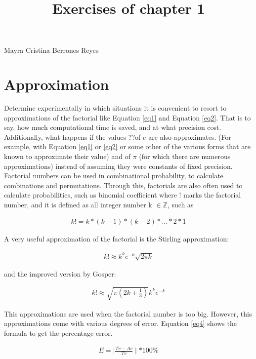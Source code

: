 \documentclass{article}
\begin{document}
\title{Exercises of chapter 1}


\maketitle
Mayra Cristina Berrones Reyes

\section{Approximation}

Determine experimentally in which situations it is convenient to resort to approximations of the factorial like Equation \ref{eq1} and Equation \ref{eq2}. That is to say, how much computational time is saved, and at what precision cost. Additionally, what happens if the values ??of $e$ are also approximates. (For example, with Equation \ref{eq1} or \ref{eq2} or some other of the various forms that are known to approximate their value) and of $\pi$ (for which there are numerous approximations) instead of assuming they were constants of fixed precision.\\

Factorial numbers can be used in combinational probability, to calculate combinations and permutations. Through this, factorials are also often used to calculate probabilities, such as binomial coefficient  where ! marks the factorial number, and it is defined as all integer number k $\in \mathbb{Z}$, such as

\begin{eqnarray}
\label{eq3}
k! = k * (k - 1) * (k - 2) *... * 2 *1
\end{eqnarray}

A very useful approximation  of the factorial is the Stirling approximation:

\begin{eqnarray}
\label{eq1}
k! \approx k^{k} e^{-k} \sqrt{2\pi k}	
\end{eqnarray}

and the improved version by Gosper:

\begin{eqnarray}
\label{eq2}
k! \approx \sqrt{\pi (2k + \frac{1}{3})} k^{k} e^{-k}
\end{eqnarray}

This approximations are used when the factorial number is too big. However, this approximations come with various degrees of error. Equation \ref{eq4} shows the formula to get the percentage error.

\begin{eqnarray}
\label{eq4}
E = \mid \frac{Tv - Av}{Tv}	 \mid * 100\%
\end{eqnarray}
\end{document}
